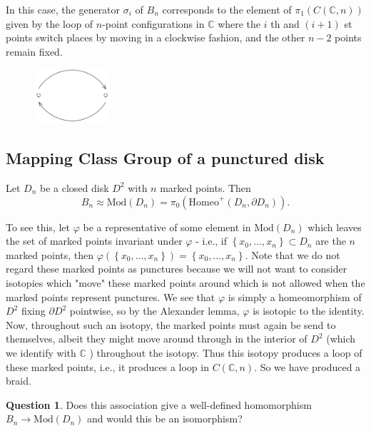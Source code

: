 \documentclass[reqno]{amsart}
\theoremstyle{definition}
\newtheorem{question}[theorem]{Question}
\theoremstyle{remark}
\newcommand{\Mod}{{\mathrm{Mod}}}
\newcommand{\Homeo}{{\mathrm{Homeo}}}
\begin{document}
In this case, the generator 
$\sigma_i$ of $B_n$ corresponds to the element
of $\pi_1 \left( C \left( \mathbb{C},n \right)  \right) $ 
given by the loop of $n$-point configurations in
$\mathbb{C}$ where the $i$ th and $\left( i+1 \right) $ st
points switch places by moving in a clockwise fashion,
and the other $n-2$ points remain fixed.

\begin{figure}[htpb]
    \centering
    \includegraphics[width=0.25\textwidth]{sigma_i_configuration.png}
    \label{fig:sigma_i_configuration-png}
\end{figure}


\subsection{Mapping Class Group of a punctured disk}

Let $D_n$ be a closed disk $D^2$ with $n$ marked points.
Then
\[
B_n \approx \Mod\left( D_n \right) =
\pi_0 \left( \Homeo^{+} \left( D_n, \partial D_n \right)  \right).
\] 

To see this, let $\varphi$ be a representative
of some element in $\Mod \left( D_n \right) $ which
leaves the set of marked points invariant under
$\varphi$ - i.e., if $\left\{ x_0, \ldots,x_n \right\} 
\subset D_n$ are the $n$ marked points, then
$\varphi \left( \left\{ x_0, \ldots,x_n \right\}  \right) 
= \left\{ x_0, \ldots, x_n \right\} $. Note that we
do not regard these marked points as punctures because
we will not want to consider isotopies which "move" these
marked points around which is not allowed when the marked points
represent punctures.
We see that
$\varphi $ is simply a homeomorphism of $D^2$ fixing
$\partial D^2$ pointwise, so by the Alexander
lemma, $\varphi $ is isotopic to the identity. Now, throughout
such an isotopy, the marked points must again be send to
themselves, albeit they might move around through
in the interior of $D^2 $ (which we identify with
$\mathbb{C}$ ) throughout the isotopy. Thus
this isotopy produces a loop of these marked points,
i.e., it produces a loop in $C \left( \mathbb{C},n \right) $.
So we have produced a braid.

\begin{question}
    Does this association give a well-defined homomorphism
    $B_n \to \Mod(D_n) $ and would this be an isomorphism?
\end{question}
\end{document}
